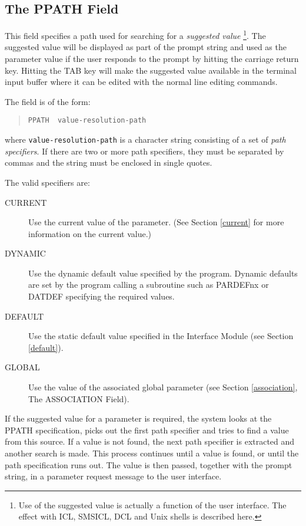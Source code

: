 \documentclass[twoside,11pt]{article}
\newcommand{\xlabel}[1]{}
\renewcommand{\_}{\texttt{\symbol{95}}}
\begin{document}
\subsection{The PPATH Field
\xlabel{the_ppath_field}\label{ppath}}

This field specifies a path used for searching for a {\em suggested value}
\footnote{Use of the suggested value is actually a function of the user
interface.
The effect with ICL, SMSICL, DCL and Unix shells is described here.}.
The suggested value will be displayed as part of the prompt string and used as
the parameter value if the user responds to the prompt by hitting the carriage
return key.
Hitting the TAB key will make the suggested value available in the
terminal input buffer where it can be edited with the normal line editing
commands.

The field is of the form:
\begin{quote} \begin{verbatim}
PPATH  value-resolution-path
\end{verbatim} \end{quote}
where \texttt{value-resolution-path} is a character string
consisting of a set of {\em path specifiers}. If there are two or more
path specifiers, they must be separated by commas and the string must be
enclosed in single quotes.

The valid specifiers are:
\begin{description}
\item[CURRENT] Use the current value of the parameter.
(See Section \ref{current} for more information on the current value.)
\item[DYNAMIC] Use the dynamic default value specified by the program.
Dynamic defaults are set by the program calling a subroutine such as
PAR\_DEFnx or DAT\_DEF specifying the required values.
\item[DEFAULT] Use the static default value specified in the Interface Module
(see Section \ref{default}).
\item[GLOBAL] Use the value of the associated global parameter (see Section
\ref{association}, The ASSOCIATION Field).
\end{description}
If the suggested value for a parameter is required, the system looks at the
PPATH specification, picks out the first path specifier and tries to
find a value from this source. If a value is not found, the next path
specifier is extracted and another search is made. This process
continues until a value is found, or until the path specification runs
out.
The value is then passed, together with the prompt string,
in a parameter request message to the user interface.
\end{document}
